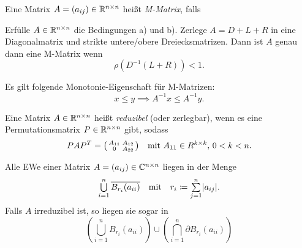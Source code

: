 \documentclass{cheat-sheet}
\newcommand{\clos}[1]{\overline{#1}} %
\begin{document}
\begin{defn}
  Eine Matrix $A = (a_{ij}) \in \mathbb{R}^{n \times n}$ heißt \emph{M-Matrix}, falls
  \begin{enumerate}[label=\alph*),leftmargin=1.6em]
  \end{enumerate}
\end{defn}

\begin{lem}
  Erfülle $A \in \mathbb{R}^{n \times n}$ die Bedingungen a) und b).
  Zerlege $A = D + L + R$ in eine Diagonalmatrix und strikte untere/obere Dreiecksmatrizen.
  Dann ist $A$ genau dann eine M-Matrix wenn
  \[ \rho(D^{-1}(L + R)) < 1. \]
\end{lem}

\begin{bem}
  Es gilt folgende Monotonie-Eigenschaft für M-Matrizen:
  \[
    x \leq y \implies
    A^{-1} x \leq A^{-1} y.
  \]
\end{bem}

\begin{defn}
  Eine Matrix $A \in \mathbb{R}^{n \times n}$ heißt \emph{reduzibel} (oder zerlegbar), wenn es eine Permutationsmatrix $P \in \mathbb{R}^{n \times n}$ gibt, sodass
  \[
    PAP^T = \begin{psmallmatrix}
      A_{11} & A_{12} \\
      0 & A_{22}
    \end{psmallmatrix} \quad
    \text{mit $A_{11} \in R^{k \times k}$, $0 < k < n$.}
  \]
\end{defn}

\begin{lem}[Gerschgorin]
  Alle EWe einer Matrix $A = (a_{ij}) \in \mathbb{C}^{n \times n}$ liegen in der Menge
  \[
    \bigcup_{i=1}^n \clos{B_{r_i}(a_{ii})}
    \quad \text{mit} \quad
    r_i \coloneqq \sum_{j=1}^n \abs{a_{ij}}.
  \]
  Falls $A$ irreduzibel ist, so liegen sie sogar in
  \[
    \left( \bigcup_{i=1}^n B_{r_i}(a_{ii}) \right) \cup
    \left( \bigcap_{i=1}^n \partial B_{r_i}(a_{ii}) \right)
  \]
\end{lem}
\end{document}
